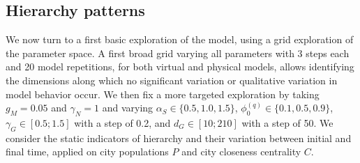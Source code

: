 \documentclass[11pt]{article}
\begin{document}
\subsection{Hierarchy patterns}


We now turn to a first basic exploration of the model, using a grid exploration of the parameter space. A first broad grid varying all parameters with 3 steps each and 20 model repetitions, for both virtual and physical models,  allows identifying the dimensions along which no significant variation or qualitative variation in model behavior occur. We then fix a more targeted exploration by taking $g_M = 0.05$ and $\gamma_N = 1$ and varying $\alpha_S \in \{0.5, 1.0, 1.5 \}$, $\phi_0^{(q)} \in \{0.1, 0.5, 0.9 \}$, $\gamma_G \in \left[0.5;1.5\right]$ with a step of 0.2, and $d_G \in \left[10; 210 \right]$ with a step of 50. We consider the static indicators of hierarchy and their variation between initial and final time, applied on city populations $P$ and city closeness centrality $C$.
\end{document}
